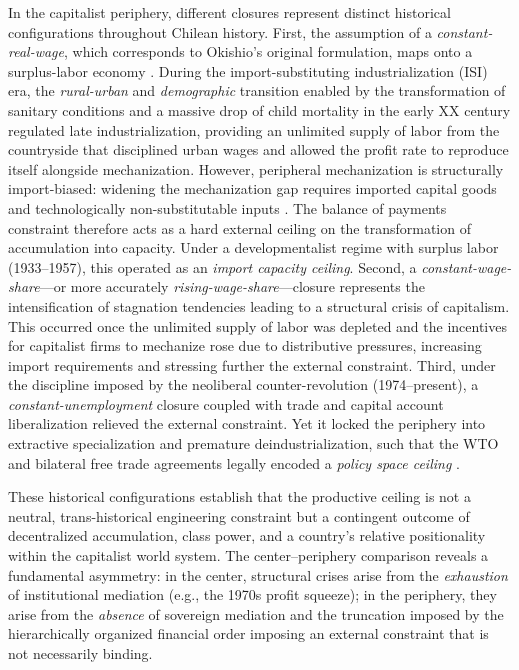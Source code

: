 In the capitalist periphery, different closures represent distinct historical configurations throughout Chilean history. First, the assumption of a
\textit{constant-real-wage}, which corresponds to
Okishio's original formulation, maps onto a surplus-labor
economy \citep{Lewis1954, Basu2026}. During the
import-substituting industrialization (ISI) era, the
\textit{rural-urban} and \textit{demographic} transition enabled by the transformation of sanitary conditions and a massive drop of child mortality in the early XX century regulated late industrialization, providing an unlimited supply of labor from the countryside that disciplined urban wages and allowed the profit rate to reproduce itself alongside mechanization. 
However, peripheral mechanization is structurally import-biased:
widening the mechanization gap requires imported capital
goods and technologically non-substitutable inputs
\citep{Prebisch1981}. The balance of payments constraint
therefore acts as a hard external ceiling on the
transformation of accumulation into capacity. Under a
developmentalist regime with surplus labor (1933--1957), this operated as an
\textit{import capacity ceiling}. Second, a \textit{constant-wage-share}---or more accurately \textit{rising-wage-share}---closure represents the intensification of stagnation tendencies leading to a structural crisis of capitalism. This occurred once the unlimited supply of labor was depleted and the incentives for capitalist firms to mechanize rose due to distributive pressures, increasing import requirements and stressing further the external constraint. Third, under the discipline imposed by the neoliberal counter-revolution \citep{Casals2021} (1974--present), a \textit{constant-unemployment} closure coupled with trade and capital account liberalization relieved the external constraint. Yet it locked the periphery into extractive specialization and premature deindustrialization, such that the WTO and bilateral free trade agreements legally encoded a \textit{policy space ceiling} \citep{Ahumada2019, Palma2019}.


These historical configurations establish that the productive
ceiling is not a neutral, trans-historical engineering
constraint but a contingent outcome of decentralized
accumulation, class power, and a country's relative
positionality within the capitalist world system. The
center--periphery comparison reveals a fundamental asymmetry:
in the center, structural crises arise from the
\textit{exhaustion} of institutional mediation (e.g., the
1970s profit squeeze); in the periphery, they arise from
the \textit{absence} of sovereign mediation and the
truncation imposed by the hierarchically organized financial order imposing 
an external constraint that is not necessarily binding. 
